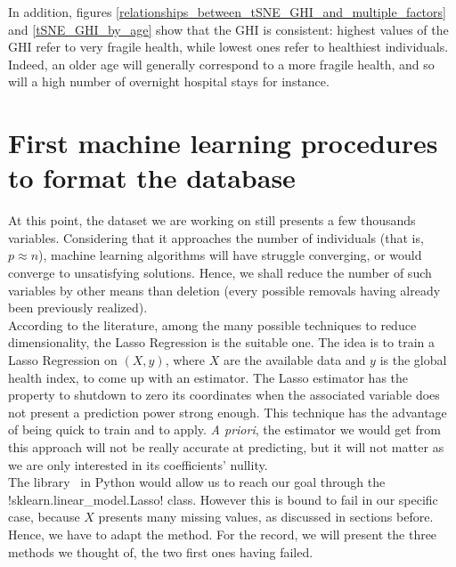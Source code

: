 \documentclass[]{article}
\begin{document}
\noindent
In addition, figures \ref{relationships_between_tSNE_GHI_and_multiple_factors} and \ref{tSNE_GHI_by_age} show that the GHI is consistent: highest values of the GHI refer to very fragile health, while lowest ones refer to healthiest individuals. Indeed, an older age will generally correspond to a more fragile health, and so will a high number of overnight hospital stays for instance.

\section{First machine learning procedures to format the database}
At this point, the dataset we are working on still presents a few thousands variables. Considering that it approaches the number of individuals (that is, $p \approx n$), machine learning algorithms will have struggle converging, or would converge to unsatisfying solutions. Hence, we shall reduce the number of such variables by other means than deletion (every possible removals having already been previously realized).\\
According to the literature, among the many possible techniques to reduce dimensionality, the Lasso Regression is the suitable one. The idea is to train a Lasso Regression on $(X, y)$, where $X$ are the available data and $y$ is the global health index, to come up with an estimator. The Lasso estimator has the property to shutdown to zero its coordinates when the associated variable does not present a prediction power strong enough. This technique has the advantage of being quick to train and to apply. \textit{A priori}, the estimator we would get from this approach will not be really accurate at predicting, but it will not matter as we are only interested in its coefficients' nullity.\\
The library \sklearn\, in Python would allow us to reach our goal through the \pyth!sklearn.linear_model.Lasso! class. However this is bound to fail in our specific case, because $X$ presents many missing values, as discussed in sections before. Hence, we have to adapt the method. For the record, we will present the three methods we thought of, the two first ones having failed.
\end{document}
